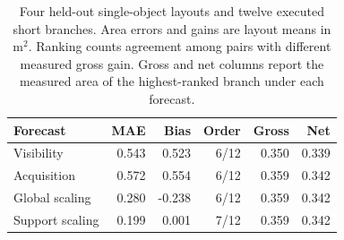 \begin{table}[tb]
\centering
\small
\caption{Four held-out single-object layouts and twelve executed short branches. Area errors and gains are layout means in $\mathrm{m}^2$. Ranking counts agreement among pairs with different measured gross gain. Gross and net columns report the measured area of the highest-ranked branch under each forecast.}
\label{tab:gain-holdout-followup}
\begin{tabular}{lrrrrr}
\toprule
Forecast & MAE & Bias & Order & Gross & Net \\
\midrule
Visibility & 0.543 & 0.523 & 6/12 & 0.350 & 0.339 \\
Acquisition & 0.572 & 0.554 & 6/12 & 0.359 & 0.342 \\
Global scaling & 0.280 & -0.238 & 6/12 & 0.359 & 0.342 \\
Support scaling & 0.199 & 0.001 & 7/12 & 0.359 & 0.342 \\
\bottomrule
\end{tabular}
\end{table}
